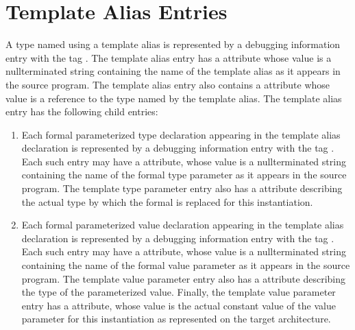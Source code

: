 \section{Template Alias Entries}
\label{chap:templatealiasentries}

A type named using a template alias is represented
by a debugging information entry with the tag
. 
The template alias entry has a
 attribute whose value is a null\dash terminated string
containing the name of the template alias as it appears in
the source program. The template alias entry also contains a
 attribute whose value is a reference to the type
named by the template alias. The template alias entry has
the following child entries:

\begin{enumerate}[1.]
\item Each formal parameterized type declaration appearing
in the template alias declaration is represented
by a debugging information entry with the tag
. Each such entry may have
a  attribute, whose value is a null\dash terminated
string containing the name of the formal type parameter as it
appears in the source program. The template type parameter
entry also has a  attribute describing the actual
type by which the formal is replaced for this instantiation.

\item Each formal parameterized value declaration
appearing in the template alias declaration is
represented by a debugging information entry with the tag
. Each such entry may have
a  attribute, whose value is a null\dash terminated
string containing the name of the formal value parameter
as it appears in the source program. The template value
parameter entry also has a  attribute describing
the type of the parameterized value. Finally, the template
value parameter entry has a  attribute, whose
value is the actual constant value of the value parameter for
this instantiation as represented on the target architecture.
\end{enumerate}

